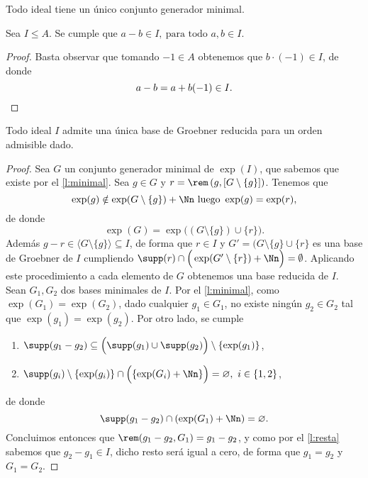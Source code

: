 \begin{lema}\label{l:minimal}
    Todo ideal tiene un único conjunto generador minimal.
\end{lema}
\begin{lema}
    Sea $I\le A$. Se cumple que $a-b\in I,\ \text{para todo } a,b\in I$. 
\end{lema}
\begin{proof}\label{l:resta}
    Basta observar que tomando $-1 \in A$ obtenemos que $b\cdot (-1) \in I$, de donde
    \begin{equation*}
        a-b = a+ b(-1) \in I.\qedhere
    \end{equation*}
\end{proof}
\begin{teorema}\label{t:reduce}
    Todo ideal $I$ admite una única base de Groebner reducida para un orden admisible dado.
\end{teorema}
\begin{proof}
     Sea $G$ un conjunto generador minimal de $\exp(I)$, que sabemos que existe por el \autoref{l:minimal}. Sea $g\in G$ y $r = \rem\left(g, [G\setminus \{g\}]\right)$. Tenemos que
    \begin{equation*}
        \exp(g) \notin \exp(G\setminus\{g\}) + \Nn \text{ luego } \exp(g)=\exp(r),
    \end{equation*}
    de donde
    \begin{equation*}
        \exp(G) = \exp\Big( (G\setminus \{g\})\cup \{r\}\Big).
    \end{equation*}
    Además $g-r\in \langle G\setminus \{g\} \rangle \subseteq I$, de forma que $r\in I$ y $G' = (G\setminus \{g\} \cup \{r\}$ es una base de Groebner de $I$ cumpliendo $\supp(r) \cap \Big(\exp(G'\setminus\{r\}) + \Nn \Big) = \emptyset$.
    Aplicando este procedimiento a cada elemento de $G$ obtenemos una base reducida de $I$.\\[5pt]
     Sean $G_1,G_2$ dos bases minimales de $I$. Por el \autoref{l:minimal}, como $\exp(G_1) = \exp(G_2)$, dado cualquier $g_1\in G_1$, no existe ningún $g_2\in G_2$ tal que $\exp(g_1) = \exp(g_2)$. Por otro lado, se cumple
    \begin{enumerate}
        \item $ \supp(g_1-g_2) \subseteq \Big( \supp(g_1)\cup \supp(g_2) \Big) \setminus \{\exp(g_1)\}$,
        \item $\supp(g_i)\setminus \{\exp(g_i)\}\cap \Big(\{\exp(G_i) + \Nn\}\Big) = \varnothing,\ i\in\{1,2\}$,
    \end{enumerate}
    de donde
    \begin{equation*}
        \supp(g_1-g_2) \cap \left(\exp(G_1)+\Nn\right) = \varnothing.
    \end{equation*}
    Concluimos entonces que $\rem(g_1-g_2, G_1) = g_1-g_2$, y como por el  \autoref{l:resta} sabemos que $g_2-g_1\in I$, dicho resto será igual a cero, de forma que $g_1=g_2$ y $G_1 = G_2$.
\end{proof}

